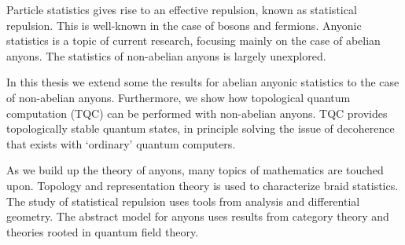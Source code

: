 Particle statistics gives rise to an effective repulsion, known as statistical repulsion. This is well-known in the case of bosons and fermions. Anyonic statistics is a topic of current research, focusing mainly on the case of abelian anyons. The statistics of non-abelian anyons is largely unexplored.

In this thesis we extend some the results for abelian anyonic statistics to the case of non-abelian anyons. Furthermore, we show how topological quantum computation (TQC) can be performed with non-abelian anyons. TQC provides topologically stable quantum states, in principle solving the issue of decoherence that exists with `ordinary' quantum computers.

As we build up the theory of anyons, many topics of mathematics are touched upon. Topology and representation theory is used to characterize braid statistics. The study of statistical repulsion uses tools from analysis and differential geometry. The abstract model for anyons uses results from category theory and theories rooted in quantum field theory.
